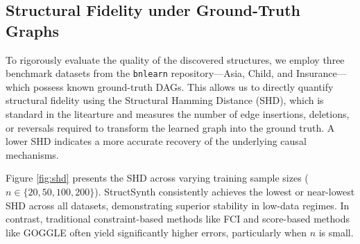 


\subsection{Structural Fidelity under Ground-Truth Graphs}

To rigorously evaluate the quality of the discovered structures, we employ three benchmark datasets from the \texttt{bnlearn} repository---Asia, Child, and Insurance---which possess known ground-truth DAGs. This allows us to directly quantify structural fidelity using the Structural Hamming Distance (SHD), which is standard in the litearture and measures the number of edge insertions, deletions, or reversals required to transform the learned graph into the ground truth. A lower SHD indicates a more accurate recovery of the underlying causal mechanisms.

Figure \ref{fig:shd} presents the SHD across varying training sample sizes ($n \in \{20, 50, 100, 200\}$). \textsf{StructSynth} consistently achieves the lowest or near-lowest SHD across all datasets, demonstrating superior stability in low-data regimes. In contrast, traditional constraint-based methods like FCI and score-based methods like GOGGLE often yield significantly higher errors, particularly when $n$ is small.

